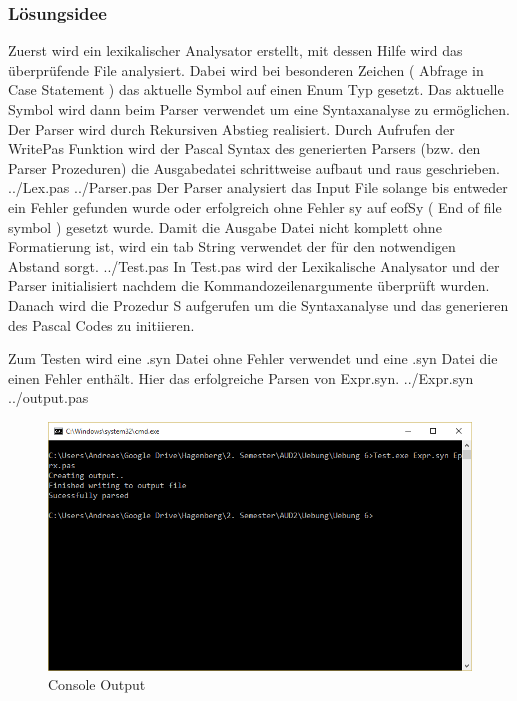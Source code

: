 \documentclass[a4papr,12pt]{article}
\begin{document}
\subsubsection*{Lösungsidee}
Zuerst wird ein lexikalischer Analysator erstellt, mit dessen Hilfe wird das überprüfende File analysiert. Dabei wird bei besonderen Zeichen ( Abfrage in Case Statement ) das aktuelle Symbol auf einen Enum Typ gesetzt. Das aktuelle Symbol wird dann beim Parser verwendet um eine Syntaxanalyse zu ermöglichen. Der Parser wird durch Rekursiven Abstieg realisiert. Durch Aufrufen der WritePas Funktion wird der Pascal Syntax des generierten Parsers (bzw. den Parser Prozeduren) die Ausgabedatei schrittweise aufbaut und raus geschrieben. 
\newline
 {../Lex.pas}
\newpage
 {../Parser.pas}
Der Parser analysiert das Input File solange bis entweder ein Fehler gefunden wurde oder erfolgreich ohne Fehler sy auf eofSy ( End of file symbol ) gesetzt wurde. Damit die Ausgabe Datei nicht komplett ohne Formatierung ist, wird ein tab String verwendet der für den notwendigen Abstand sorgt.
\newpage
 {../Test.pas}
In Test.pas wird der Lexikalische Analysator und der Parser initialisiert nachdem die Kommandozeilenargumente überprüft wurden. Danach wird die Prozedur S aufgerufen um die Syntaxanalyse und das generieren des Pascal Codes zu initiieren.
\newpage
\raggedright
Zum Testen wird eine .syn Datei ohne Fehler verwendet und eine .syn Datei die einen Fehler enthält.
Hier das erfolgreiche Parsen von Expr.syn.
\newline
 {../Expr.syn}
 {../output.pas}
\begin{figure}[H]
	\centering
	\includegraphics[scale=0.7]{./pictures/1.png}
	\caption{Console Output}
	\label{fig: ParserTest}
\end{figure}
\end{document}
